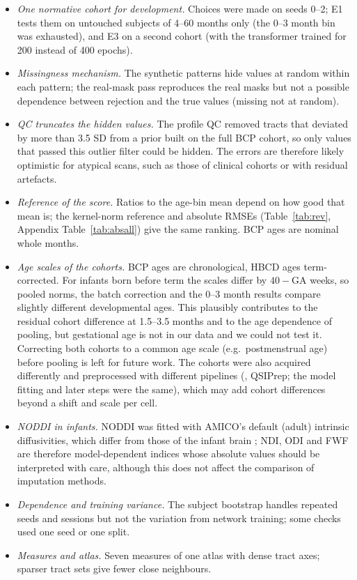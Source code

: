\documentclass[11pt]{article}
\begin{document}
\begin{itemize}
\item \emph{One normative cohort for development.} Choices were made on seeds 0--2; E1 tests them on untouched subjects
of 4--60 months only (the 0--3 month bin was exhausted), and E3 on a second cohort (with the transformer trained for 200 instead of 400 epochs).
\item \emph{Missingness mechanism.} The synthetic patterns hide values at random within each pattern; the real-mask pass
reproduces the real masks but not a possible dependence between rejection and the true values (missing not at random).
\item \emph{QC truncates the hidden values.} The profile QC removed tracts that deviated by more than 3.5 SD from a prior
built on the full BCP cohort, so only values that passed this outlier filter could be hidden. The errors are therefore
likely optimistic for atypical scans, such as those of clinical cohorts or with residual artefacts.
\item \emph{Reference of the score.} Ratios to the age-bin mean depend on how good that mean is; the kernel-norm
reference and absolute RMSEs (Table~\ref{tab:rev}, Appendix Table~\ref{tab:absall}) give the same ranking. BCP ages are
nominal whole months.
\item \emph{Age scales of the cohorts.} BCP ages are chronological, HBCD ages term-corrected. For infants born before term
the scales differ by $40-\text{GA}$ weeks, so pooled norms, the batch correction and the 0--3 month results compare
slightly different developmental ages. This plausibly contributes to the residual cohort difference at 1.5--3.5 months and
to the age dependence of pooling, but gestational age is not in our data and we could not test it. Correcting both cohorts
to a common age scale (e.g.\ postmenstrual age) before pooling is left for future work. The cohorts were also acquired differently and preprocessed with different pipelines (, QSIPrep;
the model fitting and later steps were the same), which may add cohort differences beyond a shift and scale per cell.
\item \emph{NODDI in infants.} NODDI was fitted with AMICO's default (adult) intrinsic diffusivities, which differ from
those of the infant brain \citep{cieslak2025hbcd}; NDI, ODI and FWF are therefore model-dependent indices whose absolute
values should be interpreted with care, although this does not affect the comparison of imputation methods.
\item \emph{Dependence and training variance.} The subject bootstrap handles repeated seeds and sessions but not the
variation from network training; some checks used one seed or one split.
\item \emph{Measures and atlas.} Seven measures of one atlas with dense tract axes; sparser tract sets give fewer close
neighbours.
\end{itemize}
\end{document}
